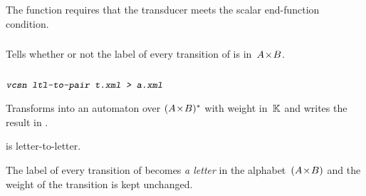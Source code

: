 \Cave
The  function requires that the transducer meets 
the scalar end-function condition.
%


% 
% 


\subsubsection{}


\begin{SwClCmd}
%
\end{SwClCmd}%
\begin{SwClTxt}
    Tells whether or not the label of every transition of 
        is in~$A\! \times \! B$.
\end{SwClTxt}%
%
%
%



\subsubsection{}

\begin{SwClCmd}
\begin{shell}
$ 
$
\end{shell}%
\end{SwClCmd}%
\begin{SwClTxt}
    Transforms  into an automaton over $(A\! \times \! B)^{*}$ with 
    weight in~$\mathbb{K}$ and writes the result in  
    . 
\end{SwClTxt}%

\Prec {} is letter-to-letter.

\Spec
The label of every transition of  becomes \emph{a letter} in the 
alphabet~$(A\! \times \! B)$ and the weight of the transition is kept unchanged.

